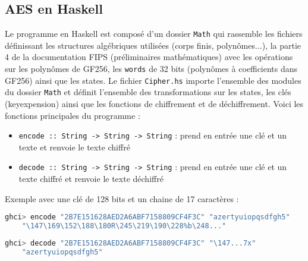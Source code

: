 \documentclass[12pt]{article}
\begin{document}
\subsection{AES en Haskell}
Le programme en Haskell est composé d'un dossier \texttt{Math} qui rassemble les fichiers définissant les structures algébriques utilisées (corps finis, polynômes...), la partie 4 de la documentation FIPS (préliminaires mathématiques) avec les opérations sur les polynômes de GF256, les \texttt{words} de 32 bits (polynômes à coefficients dans GF256) ainsi que les states. Le fichier \texttt{Cipher.hs} importe l'ensemble des modules du dossier \texttt{Math} et définit l'ensemble des transformations sur les states, les clés (keyexpension) ainsi que les fonctions de chiffrement et de déchiffrement. Voici les fonctions principales du programme :
\begin{itemize}
    \item \texttt{encode :: String -> String -> String} : prend en entrée une clé et un texte et renvoie le texte chiffré
    \item \texttt{decode :: String -> String -> String} : prend en entrée une clé et un texte chiffré et renvoie le texte déchiffré
\end{itemize}
Exemple avec une clé de 128 bits et un chaine de 17 caractères :
\begin{lstlisting}[language=Haskell]
    ghci> encode "2B7E151628AED2A6ABF7158809CF4F3C" "azertyuiopqsdfgh5"
    "\147\169\152\188\180R\245\219\190\228%b\248..."
\end{lstlisting}
\begin{lstlisting}[language=Haskell]
    ghci> decode "2B7E151628AED2A6ABF7158809CF4F3C" "\147...7x"
    "azertyuiopqsdfgh5"
\end{lstlisting}
\end{document}
